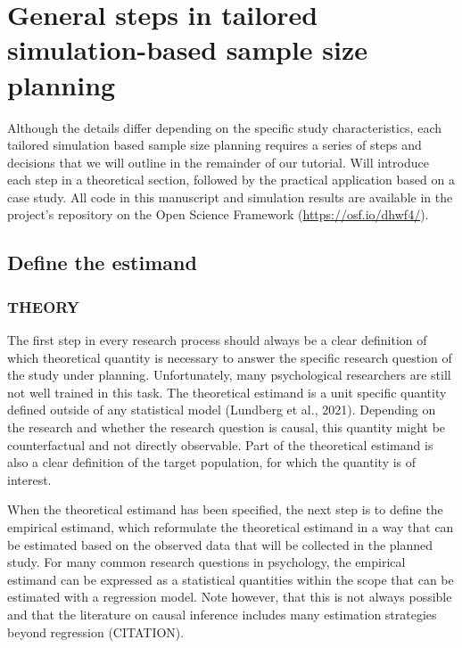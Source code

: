 \documentclass[
  man,floatsintext]{apa6}
\begin{document}
\hypertarget{general-steps-in-tailored-simulation-based-sample-size-planning}{%
\section{General steps in tailored simulation-based sample size planning}\label{general-steps-in-tailored-simulation-based-sample-size-planning}}

Although the details differ depending on the specific study characteristics, each tailored simulation based sample size planning requires a series of steps and decisions that we will outline in the remainder of our tutorial.
Will introduce each step in a theoretical section, followed by the practical application based on a case study.
All code in this manuscript and simulation results are available in the project's repository on the Open Science Framework (\url{https://osf.io/dhwf4/}).

\hypertarget{define-the-estimand}{%
\subsection{Define the estimand}\label{define-the-estimand}}

\hypertarget{theory}{%
\subsubsection{THEORY}\label{theory}}

The first step in every research process should always be a clear definition of which theoretical quantity is necessary to answer the specific research question of the study under planning.
Unfortunately, many psychological researchers are still not well trained in this task.
The theoretical estimand is a unit specific quantity defined outside of any statistical model (Lundberg et al., 2021).
Depending on the research and whether the research question is causal, this quantity might be counterfactual and not directly observable.
Part of the theoretical estimand is also a clear definition of the target population, for which the quantity is of interest.

When the theoretical estimand has been specified, the next step is to define the empirical estimand, which reformulate the theoretical estimand in a way that can be estimated based on the observed data that will be collected in the planned study.
For many common research questions in psychology, the empirical estimand can be expressed as a statistical quantities within the scope that can be estimated with a regression model.
Note however, that this is not always possible and that the literature on causal inference includes many estimation strategies beyond regression (CITATION).
\end{document}
